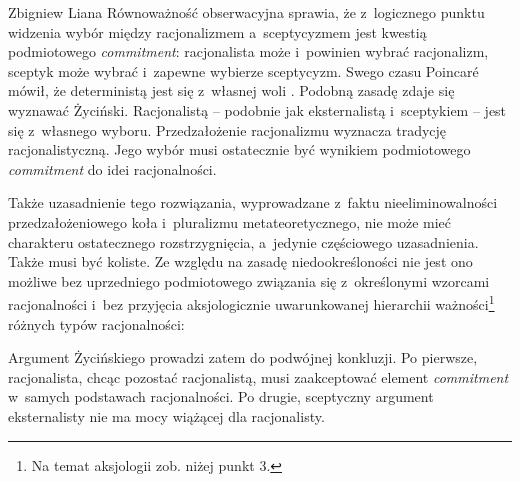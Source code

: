 \begin{artplenv}{Zbigniew Liana}
Równoważność obserwacyjna sprawia, że z~logicznego punktu widzenia wybór między racjonalizmem a~sceptycyzmem jest kwestią podmiotowego \textit{commitment}: racjonalista może i~powinien wybrać racjonalizm, sceptyk może wybrać i~zapewne wybierze sceptycyzm. Swego czasu Poincaré
\parencite*[][]{poincare_valeur_1905} %
 mówił, że deterministą jest się z~własnej woli 
\parencite[][s.~276.278]{szumilewicz-lachman_poincare_1978}. %
 Podobną zasadę zdaje się wyznawać Życiński. Racjonalistą -- podobnie jak eksternalistą i~sceptykiem -- jest się z~własnego wyboru. Przedzałożenie racjonalizmu wyznacza tradycję racjonalistyczną. Jego wybór musi ostatecznie być wynikiem podmiotowego \textit{commitment} do idei racjonalności.

Także uzasadnienie tego rozwiązania, wyprowadzane z~faktu nieeliminowalności przedzałożeniowego koła i~pluralizmu metateoretycznego, nie może mieć charakteru ostatecznego rozstrzygnięcia, a~jedynie częściowego uzasadnienia. Także musi być koliste. Ze względu na zasadę niedookreśloności nie jest ono możliwe bez uprzedniego podmiotowego związania się z~określonymi wzorcami racjonalności i~bez przyjęcia aksjologicznie uwarunkowanej hierarchii ważności\footnote{Na temat aksjologii zob. niżej punkt 3.} różnych typów racjonalności:


\enlargethispage{-\baselineskip}
Argument Życińskiego prowadzi zatem do podwójnej konkluzji. Po pierwsze, racjonalista, chcąc pozostać racjonalistą, musi zaakceptować element \textit{commitment} w~samych podstawach racjonalności. Po drugie, sceptyczny argument eksternalisty nie ma mocy wiążącej dla racjonalisty.


\end{artplenv}

